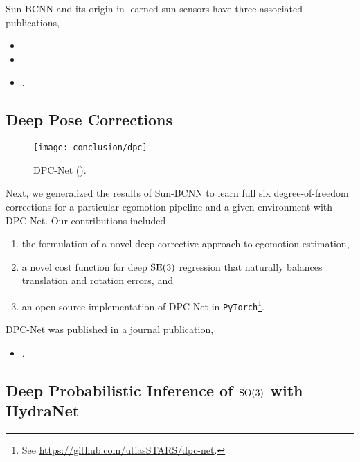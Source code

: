 \noindent Sun-BCNN and its origin in learned sun sensors have three associated publications,
\begin{itemize}
	\item {}
	\item {}
	\item {}.
\end{itemize}


\subsection{Deep Pose Corrections}

\begin{wrapfigure}{r}{0.3\textwidth}
  \begin{center}
  	\vspace{-20pt}
    \texttt{[image: conclusion/dpc]}
     \vspace{-15pt}
  \end{center}
  \caption{DPC-Net ().}
  \vspace{-5pt}
\end{wrapfigure}


Next, we generalized the results of Sun-BCNN to learn full six degree-of-freedom corrections for a particular egomotion pipeline and a given environment with DPC-Net. Our contributions included

\begin{enumerate}
	\item the formulation of a novel deep corrective approach to egomotion estimation,
	\item a novel cost function for deep $\mathrm{SE}(3)$ regression that naturally balances translation and rotation errors, and
	\item an open-source implementation of DPC-Net in \texttt{PyTorch}\footnote{See \url{https://github.com/utiasSTARS/dpc-net}.}.
\end{enumerate}

\noindent DPC-Net was published in a journal publication,
\begin{itemize}
	\item {}.
\end{itemize}


\subsection{Deep Probabilistic Inference of $\mathrm{SO}(3)$ with HydraNet}

